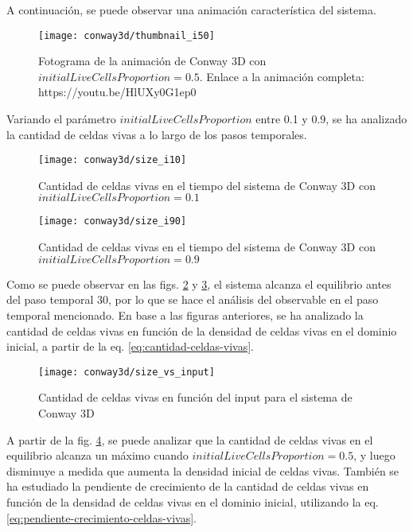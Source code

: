 A continuación, se puede observar una animación característica del sistema.

\begin{figure}[H]
    \centering
    \texttt{[image: conway3d/thumbnail\_i50]}
    \caption{Fotograma de la animación de Conway 3D con $initialLiveCellsProportion = 0.5$. Enlace a la animación completa: https://youtu.be/HlUXy0G1ep0}
    \label{fig:thumbnailconway3d_i50}
\end{figure}

Variando el parámetro $initialLiveCellsProportion$ entre 0.1 y 0.9, se ha analizado la cantidad de celdas vivas
a lo largo de los pasos temporales.

\begin{figure}[H]
    \centering
    \texttt{[image: conway3d/size\_i10]}
    \caption{Cantidad de celdas vivas en el tiempo del sistema de Conway 3D con $initialLiveCellsProportion = 0.1$}
    \label{fig:conway3d_i10}
\end{figure}
\begin{figure}[H]
    \centering
    \texttt{[image: conway3d/size\_i90]}
    \caption{Cantidad de celdas vivas en el tiempo del sistema de Conway 3D con $initialLiveCellsProportion = 0.9$}
    \label{fig:conway3d_i90}
\end{figure}

Como se puede observar en las figs. \ref{fig:conway3d_i10} y \ref{fig:conway3d_i90}, el sistema alcanza el equilibrio
antes del paso temporal 30, por lo que se hace el análisis del observable en el paso temporal mencionado.
En base a las figuras anteriores, se ha analizado la cantidad de celdas vivas en función de la densidad de celdas
vivas en el dominio inicial, a partir de la eq. \ref{eq:cantidad-celdas-vivas}.

\begin{figure}[H]
    \centering
    \texttt{[image: conway3d/size\_vs\_input]}
    \caption{Cantidad de celdas vivas en función del input para el sistema de Conway 3D}
    \label{fig:conway3d_size_vs_input}
\end{figure}

A partir de la fig. \ref{fig:conway3d_size_vs_input}, se puede analizar que la cantidad
de celdas vivas en el equilibrio alcanza un máximo cuando $initialLiveCellsProportion = 0.5$, y luego
disminuye a medida que aumenta la densidad inicial de celdas vivas.
También se ha estudiado la pendiente de crecimiento de la cantidad de celdas vivas en función de la densidad
de celdas vivas en el dominio inicial, utilizando la eq. \ref{eq:pendiente-crecimiento-celdas-vivas}.

